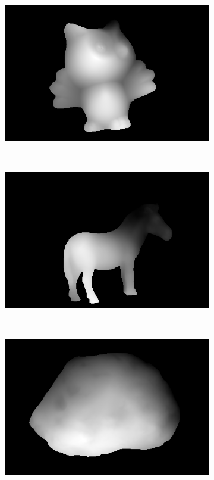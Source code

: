 \documentclass{paper}
\begin{document}
\begin{figure}[h!]
     \begin{subfigure}{0.3\textwidth}
        \includegraphics[width=\textwidth]{results/owl/owl_depthmap}
    \end{subfigure}
    ~
    \begin{subfigure}{0.3\textwidth}
        \includegraphics[width=\textwidth]{results/horse/horse_depthmap}
    \end{subfigure}
    ~
    \begin{subfigure}{0.3\textwidth}
        \includegraphics[width=\textwidth]{results/rock/rock_depthmap}

\end{subfigure}
\end{figure}
\end{document}
